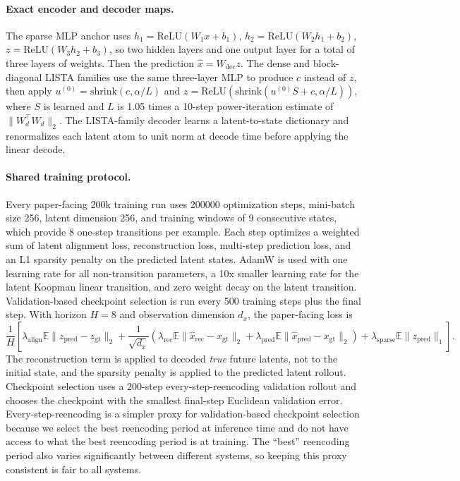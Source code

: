 \paragraph{Exact encoder and decoder maps.}
The sparse MLP anchor uses
$h_1 = \mathrm{ReLU}(W_1 x + b_1)$,
$h_2 = \mathrm{ReLU}(W_2 h_1 + b_2)$,
$z = \mathrm{ReLU}(W_3 h_2 + b_3)$, so two hidden layers and one output layer for a total of three layers of weights. Then the prediction
$\hat{x} = W_{\mathrm{dec}} z$.
The dense and block-diagonal LISTA families use the same three-layer MLP to produce
$c$ instead of $z$, then apply
$u^{(0)} = \mathrm{shrink}(c, \alpha / L)$ and
$z = \mathrm{ReLU}(\mathrm{shrink}(u^{(0)} S + c, \alpha / L))$,
where $S$ is learned and
$L$ is 1.05 times a 10-step power-iteration estimate of
$\|W_d^\top W_d\|_2$.
The LISTA-family decoder learns a latent-to-state dictionary and renormalizes
each latent atom to unit norm at decode time before applying the linear decode.

\paragraph{Shared training protocol.}
Every paper-facing 200k training run uses 200000 optimization steps, mini-batch
size 256, latent dimension 256, and training windows of 9 consecutive states,
which provide 8 one-step transitions per example. Each step optimizes a weighted
sum of latent alignment loss, reconstruction loss, multi-step prediction loss,
and an L1 sparsity penalty on the predicted latent states. AdamW is used with
one learning rate for all non-transition parameters, a 10x smaller learning rate for
the latent Koopman linear transition, and zero weight decay on the latent transition.
Validation-based checkpoint selection is run every 500 training steps plus the final step. With horizon
$H = 8$ and observation dimension $d_x$, the paper-facing loss is
\[
\frac{1}{H}\left[
\lambda_{\mathrm{align}} \mathbb{E}\|z_{\mathrm{pred}} - z_{\mathrm{gt}}\|_2
+
 \frac{1}{\sqrt{d_x}}(\lambda_{\mathrm{rec}} \mathbb{E}\|\hat{x}_{\mathrm{rec}} - x_{\mathrm{gt}}\|_2
+
\lambda_{\mathrm{pred}} \mathbb{E}\|\hat{x}_{\mathrm{pred}} - x_{\mathrm{gt}}\|_2)
+
\lambda_{\mathrm{sparse}}  \mathbb{E}\|z_{\mathrm{pred}}\|_1\right].
\]
The reconstruction term is applied to decoded \emph{true} future latents, not
to the initial state, and the sparsity penalty is applied to the predicted
latent rollout. Checkpoint selection uses a 200-step every-step-reencoding validation rollout and chooses the checkpoint with the smallest final-step Euclidean validation error. Every-step-reencoding is a simpler proxy for validation-based checkpoint selection because we select the best reencoding period at inference time and do not have access to what the best reencoding period is at training. The ``best'' reencoding period also varies significantly between different systems, so keeping this proxy consistent is fair to all systems.

